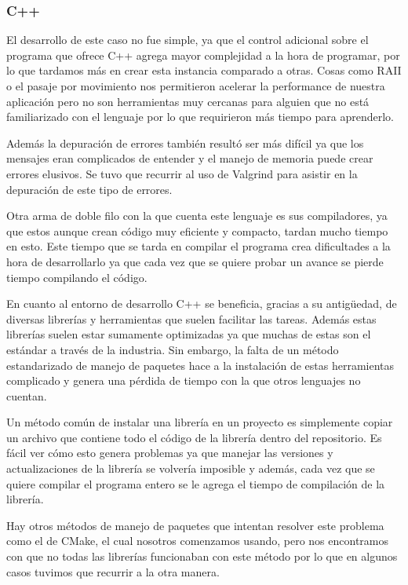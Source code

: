 \documentclass[11pt]{article}
\let\Oldsubsubsection\subsubsection
\renewcommand{\subsubsection}{\FloatBarrier\Oldsubsubsection}
\begin{document}
\subsubsection{C++}

El desarrollo de este caso no fue simple, ya que el control adicional sobre el programa que ofrece C++ agrega mayor complejidad a la hora de programar, por lo que tardamos más en crear esta instancia comparado a otras. Cosas como RAII o el pasaje por movimiento nos permitieron acelerar la performance de nuestra aplicación pero no son herramientas muy cercanas para alguien que no está familiarizado con el lenguaje por lo que requirieron más tiempo para aprenderlo. 

Además la depuración de errores también resultó ser más difícil ya que los mensajes eran complicados de entender y el manejo de memoria puede crear errores elusivos. Se tuvo que recurrir al uso de Valgrind para asistir en la depuración de este tipo de errores.

Otra arma de doble filo con la que cuenta este lenguaje es sus compiladores, ya que estos aunque crean código muy eficiente y compacto, tardan mucho tiempo en esto. Este tiempo que se tarda en compilar el programa crea dificultades a la hora de desarrollarlo ya que cada vez que se quiere probar un avance se pierde tiempo compilando el código.

En cuanto al entorno de desarrollo C++ se beneficia, gracias a su antigüedad, de diversas librerías y herramientas que suelen facilitar las tareas. Además estas librerías suelen estar sumamente optimizadas ya que muchas de estas son el estándar a través de la industria. Sin embargo, la falta de un método estandarizado de manejo de paquetes hace a la instalación de estas herramientas complicado y genera una pérdida de tiempo con la que otros lenguajes no cuentan.

Un método común de instalar una librería en un proyecto es simplemente copiar un archivo que contiene todo el código de la librería dentro del repositorio. Es fácil ver cómo esto genera problemas ya que manejar las versiones y actualizaciones de la librería se volvería imposible y además, cada vez que se quiere compilar el programa entero se le agrega el tiempo de compilación de la librería.

Hay otros métodos de manejo de paquetes que intentan resolver este problema como el de CMake, el cual nosotros comenzamos usando, pero nos encontramos con que no todas las librerías funcionaban con este método por lo que en algunos casos tuvimos que recurrir a la otra manera.
\end{document}

